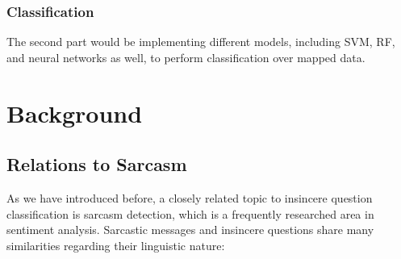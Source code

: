 \documentclass[12pt]{diazessay} %
\begin{document}
\subsubsection{Classification}

The second part would be implementing different models, including SVM, RF, and neural networks as well, to perform classification over mapped data.


\section{Background}


\subsection{Relations to Sarcasm} \label{relations-to-sarcasm}

As we have introduced before, a closely related topic to insincere question classification is sarcasm detection, which is a frequently researched area in sentiment analysis\citep{joshi2017}. Sarcastic messages and insincere questions share many similarities regarding their linguistic nature:
\end{document}
